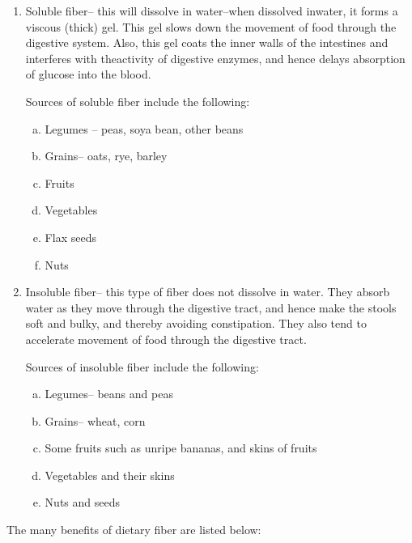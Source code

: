 \begin{enumerate}
\itemsep=0pt
\item Soluble fiber– this will dissolve in water–when dissolved in\break water, it forms a viscous (thick) gel. This gel slows down the movement of food through the digestive system. Also, this gel coats the inner walls of the intestines and interferes with the\break activity of digestive enzymes, and hence delays absorption of glucose into the blood.

Sources of soluble fiber include the following:
\begin{enumerate}[a)]
\itemsep=0pt
\item Legumes – peas, soya bean, other beans
\item Grains– oats, rye, barley
\item Fruits
\item Vegetables
\item Flax seeds
\item Nuts
\end{enumerate}
\item Insoluble fiber– this type of fiber does not dissolve in water. They absorb water as they move through the digestive tract, and hence make the stools soft and bulky, and thereby avoiding constipation. They also tend to accelerate movement of food through the digestive tract.

Sources of insoluble fiber include the following:
\begin{enumerate}[a)]
\itemsep=0pt
\item Legumes– beans and peas
\item Grains– wheat, corn
\item Some fruits such as unripe bananas, and skins of fruits
\item Vegetables and their skins
\item Nuts and seeds
\end{enumerate}
\end{enumerate}

\noindent The many benefits of dietary fiber are listed below:

